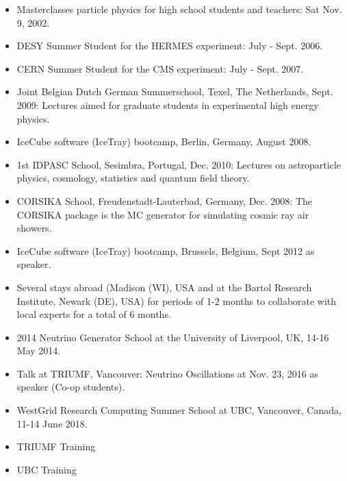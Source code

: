 \documentclass[11pt,a4paper,oneside,fleqn]{article}
\begin{document}
\begin{itemize}
\item Masterclasses particle physics for high school students and teachers: Sat Nov. 9, 2002.
\item DESY Summer Student for the HERMES experiment: July - Sept. 2006. %
\item CERN Summer Student for the CMS experiment: July - Sept. 2007. 
\item Joint Belgian Dutch German Summerschool, Texel, The Netherlands, Sept. 2009: Lectures aimed for graduate students in experimental high energy physics.
\item IceCube software (IceTray) bootcamp, Berlin, Germany, August 2008.
\item 1st IDPASC School, Sesimbra, Portugal, Dec. 2010: Lectures on astroparticle physics, cosmology, statistics and quantum field theory.
\item CORSIKA School, Freudenstadt-Lauterbad, Germany, Dec. 2008: The CORSIKA package is the MC generator for simulating cosmic ray air showers.
\item IceCube software (IceTray) bootcamp, Brussels, Belgium, Sept 2012 as speaker.
\item Several stays abroad (Madison (WI), USA and at the Bartol Research Institute, Newark (DE), USA) for periods of 1-2 months to collaborate with local experts for a total of 6 months.
\item 2014 Neutrino Generator School at the University of Liverpool, UK, 14-16 May 2014. %
\item Talk at TRIUMF, Vancouver: Neutrino Oscillations at Nov. 23, 2016 as speaker (Co-op students).
\item WestGrid Research Computing Summer School at UBC, Vancouver, Canada, 11-14 June 2018. %
\item TRIUMF Training
\item UBC Training
\end{itemize}
\end{document}
